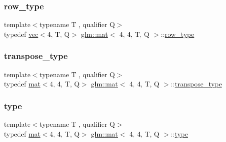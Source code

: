 \mbox{\label{structglm_1_1mat_3_014_00_014_00_01_t_00_01_q_01_4_a2f05ded6544c98508d5f29e498d2e4dd}} 
\subsubsection{\texorpdfstring{row\+\_\+type}{row\_type}}
{\footnotesize\ttfamily template$<$typename T , qualifier Q$>$ \\
typedef \hyperlink{structglm_1_1vec}{vec}$<$4, T, Q$>$ \hyperlink{structglm_1_1mat}{glm\+::mat}$<$ 4, 4, T, Q $>$\+::\hyperlink{structglm_1_1mat_3_014_00_014_00_01_t_00_01_q_01_4_a2f05ded6544c98508d5f29e498d2e4dd}{row\+\_\+type}}

\mbox{\label{structglm_1_1mat_3_014_00_014_00_01_t_00_01_q_01_4_aae643ca23a5e538e908086e5149f500f}} 
\subsubsection{\texorpdfstring{transpose\+\_\+type}{transpose\_type}}
{\footnotesize\ttfamily template$<$typename T , qualifier Q$>$ \\
typedef \hyperlink{structglm_1_1mat}{mat}$<$4, 4, T, Q$>$ \hyperlink{structglm_1_1mat}{glm\+::mat}$<$ 4, 4, T, Q $>$\+::\hyperlink{structglm_1_1mat_3_014_00_014_00_01_t_00_01_q_01_4_aae643ca23a5e538e908086e5149f500f}{transpose\+\_\+type}}

\mbox{\label{structglm_1_1mat_3_014_00_014_00_01_t_00_01_q_01_4_a2151b2f14fc2ccf6e39a0ca3182270c2}} 
\subsubsection{\texorpdfstring{type}{type}}
{\footnotesize\ttfamily template$<$typename T , qualifier Q$>$ \\
typedef \hyperlink{structglm_1_1mat}{mat}$<$4, 4, T, Q$>$ \hyperlink{structglm_1_1mat}{glm\+::mat}$<$ 4, 4, T, Q $>$\+::\hyperlink{structglm_1_1mat_3_014_00_014_00_01_t_00_01_q_01_4_a2151b2f14fc2ccf6e39a0ca3182270c2}{type}}

